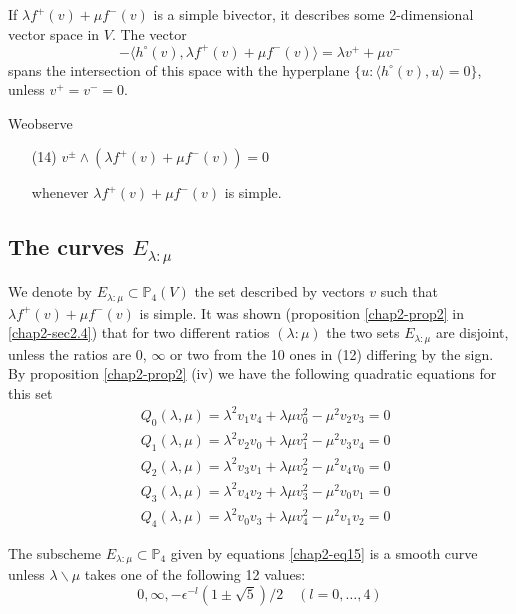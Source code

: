 If $\lambda f^{+}(v)+\mu f^{-}(v)$ is a simple bivector, it describes
some 2-dimensio\-nal vector space in $V$. The vector
$$
-\langle h^{\circ}(v), \lambda f^{+}(v)+\mu f^{-}(v)\rangle =\lambda
 v^{+}+\mu v^{-}
$$
spans the intersection of this space with the hyperplane $\{u:\langle
h^{\circ}(v),u\rangle=0\}$, unless $v^{+}=v^{-}=0$.

We\pageoriginale observe
\begin{itemize}
\item[(14)] $v^{\pm}\wedge (\lambda f^{+}(v)+\mu f^{-}(v))=0$

whenever $\lambda f^{+}(v)+\mu f^{-}(v)$ is simple.
\end{itemize}

\subsection{The curves \texorpdfstring{$E_{\lambda:\mu}$}{El}}\label{chap2-sec2.5}

We denote by $E_{\lambda:\mu}\subset \mathbb{P}_{4}(V)$ the set
described by vectors $v$ such that $\lambda f^{+}(v)+\mu f^{-}(v)$ is
simple. It was shown (proposition \ref{chap2-prop2}
in \ref{chap2-sec2.4}) that for two different ratios $(\lambda:\mu)$
the two sets $E_{\lambda:\mu}$ are disjoint, unless the ratios are
$0$, $\infty$ or two from the 10 ones in (12) differing by the
sign. By proposition \ref{chap2-prop2} (iv) we have the following
quadratic equations for this set
\setcounter{equation}{14}
\begin{equation}
\begin{split}
& Q_{0}(\lambda,\mu)=\lambda^{2}v_{1}v_{4}+\lambda \mu
v^{2}_{0}-\mu^{2}v_{2}v_{3}=0\\
& Q_{1}(\lambda,\mu)=\lambda^{2}v_{2}v_{0}+\lambda \mu
v^{2}_{1}-\mu^{2}v_{3}v_{4}=0\\
& Q_{2}(\lambda,\mu)=\lambda^{2}v_{3}v_{1}+\lambda \mu
v^{2}_{2}-\mu^{2}v_{4}v_{0}=0\\
& Q_{3}(\lambda,\mu)=\lambda^{2}v_{4}v_{2}+\lambda\mu
v^{2}_{3}-\mu^{2}v_{0}v_{1}=0\\
& Q_{4}(\lambda,\mu)=\lambda^{2}v_{0}v_{3}+\lambda\mu
v^{2}_{4}-\mu^{2}v_{1}v_{2}=0 
\end{split}\label{chap2-eq15}
\end{equation}

\begin{proposition}\label{chap2-prop3}
The subscheme $E_{\lambda:\mu}\subset \mathbb{P}_{4}$ given by
equations \eqref{chap2-eq15} is a smooth curve unless
$\lambda\backslash \mu$ takes one of the following 12 values:
$$
0,\infty, -\epsilon^{-l}(1\pm \sqrt{5})/2 \quad (l=0,\ldots,4)
$$
\end{proposition}

